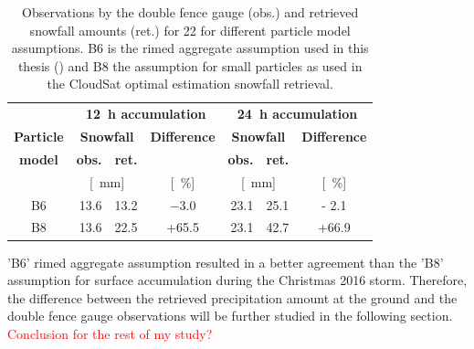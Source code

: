 \begin{table}[t]
	\begin{center}
		\caption{Observations by the double fence gauge (obs.) and retrieved  snowfall amounts (ret.) for \SI{22}{\dec} for different particle model assumptions. B6 is the rimed aggregate assumption used in this thesis () and B8 the assumption for small particles as used in the CloudSat optimal estimation snowfall retrieval.}\label{tab:res:ret_sens}
		\begin{tabular}{c||r|r|c||r|r|c}
			\hline \hline
			& \multicolumn{3}{c||}{\textbf{\SI{12}{\hour} accumulation}} & \multicolumn{3}{c}{\textbf{\SI{24}{\hour} accumulation}}    \\\cline{2-7}
			\textbf{Particle} & \multicolumn{2}{c|}{\textbf{Snowfall}} & \textbf{Difference} &  \multicolumn{2}{c|}{\textbf{Snowfall}} & \textbf{Difference}   \\\cline{2-3} \cline{5-6}
			\textbf{model} & \textbf{obs.} & \textbf{ret.} && \textbf{obs.} & \textbf{ret.} &  \\\cline{2-7}
			& \multicolumn{2}{c|}{[\SI{}{\mm}]} & [\SI{}{\percent}]  & \multicolumn{2}{c|}{[\SI{}{\mm}]} & [\SI{}{\percent}]  \\ \hline\hline
			B6  & \num{13.6} &\num{13.2} & \num{-3.0} & \num{23.1} & \num{25.1} & \num{- 2.1}  \\\hline
			B8  & \num{13.6} &\num{22.5} & +\num{65.5} & \num{23.1} & \num{42.7} & +\num{66.9}  \\\hline\hline
		\end{tabular}
	\end{center}
\end{table}
'B6' rimed aggregate assumption resulted in a better agreement than the 'B8' assumption for surface accumulation during the Christmas 2016 storm. Therefore, the difference between the retrieved precipitation amount at the ground and the double fence gauge observations will be further studied in the following section. 
\textcolor{red}{Conclusion for the rest of my study?} 











